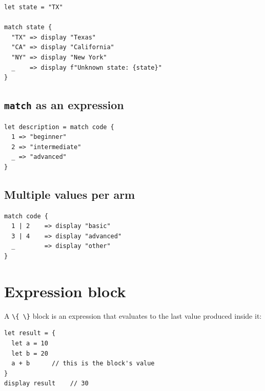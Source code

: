 \begin{lstlisting}
let state = "TX"

match state {
  "TX" => display "Texas"
  "CA" => display "California"
  "NY" => display "New York"
  _    => display f"Unknown state: {state}"
}
\end{lstlisting}

\subsection*{\texttt{match} as an expression}

\begin{lstlisting}
let description = match code {
  1 => "beginner"
  2 => "intermediate"
  _ => "advanced"
}
\end{lstlisting}

\subsection*{Multiple values per arm}

\begin{lstlisting}
match code {
  1 | 2    => display "basic"
  3 | 4    => display "advanced"
  _        => display "other"
}
\end{lstlisting}

\section{Expression block}

A \lstinline|\{ \}| block is an expression that evaluates to the last
value produced inside it:

\begin{lstlisting}
let result = {
  let a = 10
  let b = 20
  a + b      // this is the block's value
}
display result    // 30
\end{lstlisting}
